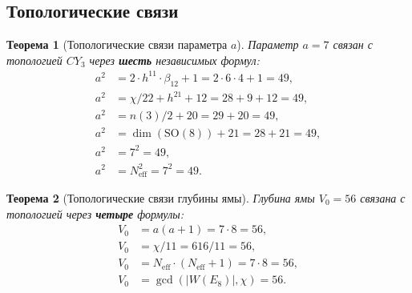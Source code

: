 \documentclass[11pt,a4paper]{article}
\newcommand{\SO}{\ensuremath{\mathrm{SO}}}
\newcommand{\CY}{\ensuremath{CY_3}}
\newtheorem{theorem}{Теорема}[section]
\theoremstyle{definition}
\begin{document}
\subsection{Топологические связи}
\label{subsec:membrane-topology}

\begin{theorem}[Топологические связи параметра $a$]
\label{thm:membrane-topology}
Параметр $a = 7$ связан с топологией $\CY$ через \textbf{шесть}
независимых формул:
\begin{align}
    a^2 &= 2 \cdot h^{11} \cdot \beta_{12} + 1 = 2 \cdot 6 \cdot 4 + 1 = 49,
    \label{eq:membrane-a2-1} \\
    a^2 &= \chi/22 + h^{21} + 12 = 28 + 9 + 12 = 49,
    \label{eq:membrane-a2-2} \\
    a^2 &= n(3)/2 + 20 = 29 + 20 = 49,
    \label{eq:membrane-a2-3} \\
    a^2 &= \dim(\SO(8)) + 21 = 28 + 21 = 49,
    \label{eq:membrane-a2-4} \\
    a^2 &= 7^2 = 49,
    \label{eq:membrane-a2-5} \\
    a^2 &= N_{\text{eff}}^2 = 7^2 = 49.
    \label{eq:membrane-a2-6}
\end{align}
\end{theorem}

\begin{theorem}[Топологические связи глубины ямы]
\label{thm:membrane-V0}
Глубина ямы $V_0 = 56$ связана с топологией через \textbf{четыре}
формулы:
\begin{align}
    V_0 &= a(a+1) = 7 \cdot 8 = 56,
    \label{eq:membrane-V0-1} \\
    V_0 &= \chi/11 = 616/11 = 56,
    \label{eq:membrane-V0-2} \\
    V_0 &= N_{\text{eff}} \cdot (N_{\text{eff}} + 1) = 7 \cdot 8 = 56,
    \label{eq:membrane-V0-3} \\
    V_0 &= \gcd(|W(E_8)|, \chi) = 56.
    \label{eq:membrane-V0-4}
\end{align}
\end{theorem}
\end{document}
